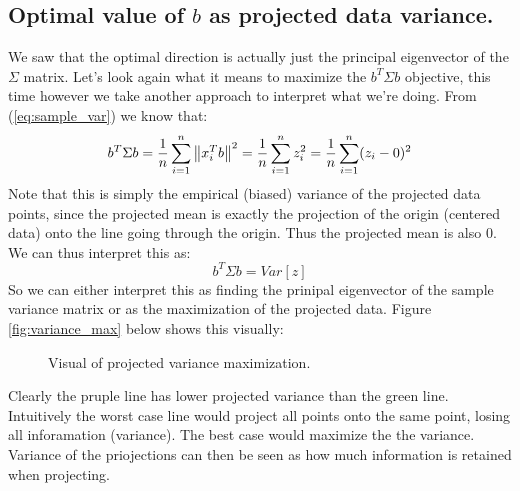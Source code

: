 		\subsection{Optimal value of $b$ as projected data variance.}
		We saw that the optimal direction is actually just the principal eigenvector of the $\Sigma$ matrix. Let's look again what it means to maximize the $b^T\Sigma b$ objective, this time however we take another approach to interpret what we're doing. From (\ref{eq:sample_var}) we know that:
		\begin{equation}
			b^T\Sigma b = \frac{1}{n}\sum_{i=1}^{n}\left\lVert x_i^Tb\right\rVert^2 = \frac{1}{n}\sum_{i=1}^{n}z_i^2 = \frac{1}{n}\sum_{i=1}^{n}(z_i - 0)^2
		\end{equation}
		Note that this is simply the empirical (biased) variance of the projected data points, since the projected mean is exactly the projection of the origin (centered data) onto the line going through the origin. Thus the projected mean is also $0$. We can thus interpret this as:
		\begin{equation}
			b^T\Sigma b = Var[z]
		\end{equation}
		So we can either interpret this as finding the prinipal eigenvector of the sample variance matrix or as the maximization of the projected data. Figure \ref{fig:variance_max} below shows this visually:
		\begin{figure}[h!]
			\centering
			\caption{Visual of projected variance maximization.}
		\end{figure}
		Clearly the pruple line has lower projected variance than the green line. Intuitively the worst case line would project all points onto the same point, losing all inforamation (variance). The best case would maximize the the variance. Variance of the priojections can then be seen as how much information is retained when projecting.

